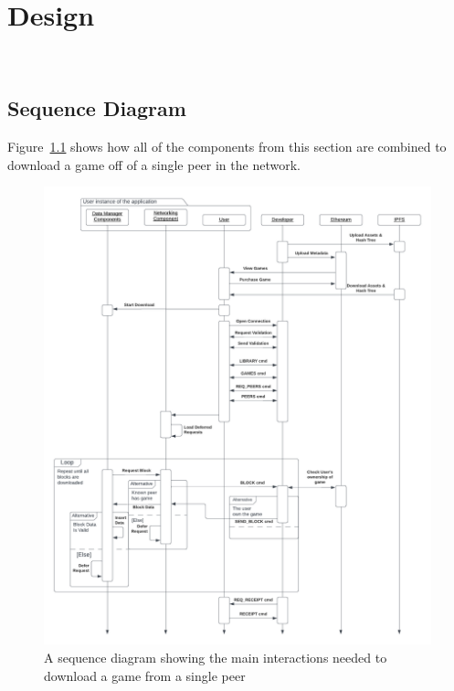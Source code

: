 \chapter{Design}~\label{ch:design}






\newpage
\section{Sequence Diagram}

Figure~\ref{fig:p2p-interactions} shows how all of the components from this section are combined to download a game off of a single peer in the network.

\begin{figure}[H]
  \centering\hspace{-16.5mm}
  \includegraphics[width=1.1\textwidth]{assets/images/diagrams/p2p-sequence.png}
  \caption{A sequence diagram showing the main interactions needed to download a game from a single peer}
  \label{fig:p2p-interactions}
\end{figure}